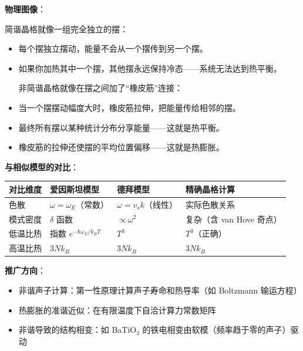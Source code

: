 \begin{insightbox}[物理图像与模型关联]
\textbf{物理图像}：

简谐晶格就像一组完全独立的摆：
\begin{itemize}[nosep]
    \item 每个摆独立摆动，能量不会从一个摆传到另一个摆。
    \item 如果你加热其中一个摆，其他摆永远保持冷态——系统无法达到热平衡。

非简谐晶格就像在摆之间加了``橡皮筋''连接：
    \item 当一个摆摆动幅度大时，橡皮筋拉伸，把能量传给相邻的摆。
    \item 最终所有摆以某种统计分布分享能量——这就是热平衡。
    \item 橡皮筋的拉伸还使摆的平均位置偏移——这就是热膨胀。
\end{itemize}

\textbf{与相似模型的对比}：
\begin{center}
\begin{tabular}{llll}
\toprule
\textbf{对比维度} & \textbf{爱因斯坦模型} & \textbf{德拜模型} & \textbf{精确晶格计算} \\
\midrule
色散 & $\omega=\omega_E$（常数） & $\omega=v_s k$（线性） & 实际色散关系 \\
模式密度 & $\delta$ 函数 & $\propto\omega^2$ & 复杂（含 van Hove 奇点） \\
低温比热 & 指数 $e^{-\hbar\omega_E/k_BT}$ & $T^3$ & $T^3$（正确） \\
高温比热 & $3Nk_B$ & $3Nk_B$ & $3Nk_B$ \\
\bottomrule
\end{tabular}
\end{center}

\textbf{推广方向}：
\begin{itemize}[nosep]
    \item 非谐声子计算：第一性原理计算声子寿命和热导率（如 Boltzmann 输运方程）
    \item 热膨胀的准谐近似：在有限温度下自洽计算力常数矩阵
    \item 非谐导致的结构相变：如 BaTiO$_3$ 的铁电相变由软模（频率趋于零的声子）驱动
\end{itemize}
\end{insightbox}

